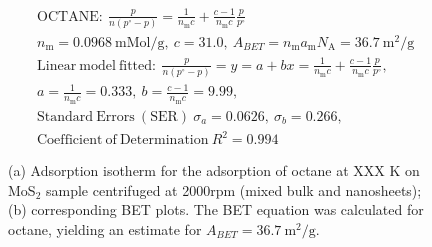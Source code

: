 

\begin{align*}
&\mathrm{OCTANE:}\ \frac{p}{n(p^\circ-p)}=\frac{1}{n_\mathrm{m}c}+\frac{c-1}{n_\mathrm{m}c}\frac{p}{p^\circ}\\
&{n_\mathrm{m}}=0.0968\ \mathrm{mMol/g},\ c=31.0,\ A_{BET}={n_\mathrm{m}}{a_\mathrm{m}}{N_\mathrm{A}}=36.7\ \mathrm{m}^2\mathrm{/g}\\
&\mathrm{Linear\ model\ fitted:}\ \frac{p}{n(p^\circ-p)}=y=a+bx=\frac{1}{n_\mathrm{m}c}+\frac{c-1}{n_\mathrm{m}c}\frac{p}{p^\circ},\\
&a=\frac{1}{n_\mathrm{m}c}=0.333,\ b=\frac{c-1}{n_\mathrm{m}c}=9.99,\\
&\mathrm{Standard\ Errors\ (SER)}\ \sigma_a=0.0626,\ \sigma_b=0.266,\\
&\mathrm{Coefficient\ of\ Determination}\ R^2 = 0.994
\end{align*}


\begin{figure}[htb]
\hfill
{}
\caption{(a) Adsorption isotherm for the adsorption of octane at XXX K on MoS$_2$ 
sample centrifuged at 2000rpm (mixed bulk and nanosheets);
(b) corresponding BET plots. The BET equation was calculated for octane, yielding an estimate for $A_{BET}=36.7\ \mathrm{m}^2\mathrm{/g}$.}

\label{fig:sa-Nanosheets-Prep-I-750rpm-20mg-01-3mm-30C-S1-SA-10ml}
\end{figure}



